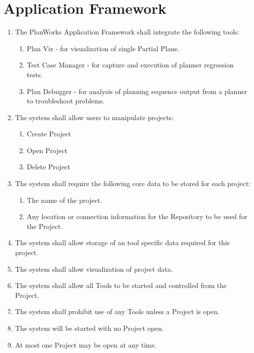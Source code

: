 \documentclass[twoside, 11pt]{article}
\begin{document}
\section{Application Framework}
\begin{enumerate}
\item The PlanWorks Application Framework shall integrate the following tools:
\begin{enumerate}
\item Plan Viz - for visualization of single Partial Plans.
\item Test Case Manager - for capture and execution of planner regression tests.
\item Plan Debugger - for analysis of planning sequence output from a planner to troubleshoot problems.
\end{enumerate}
\item The system shall allow users to manipulate projects:
\begin{enumerate}
\item Create Project
\item Open Project
\item Delete Project
\end{enumerate}
\item The system shall require the following core data to be stored for each project:
\begin{enumerate}
\item The name of the project. 
\item Any location or connection information for the Repository to be used for the Project.
\end{enumerate}
\item The system shall allow storage of an tool specific data required for this project.
\item The system shall allow visualization of project data.
\item The system shall allow all Tools to be started and controlled from the Project.
\item The system shall prohibit use of any Tools unless a Project is open.
\item The system will be started with no Project open.
\item At most one Project may be open at any time.
\end{enumerate}
\end{document}
